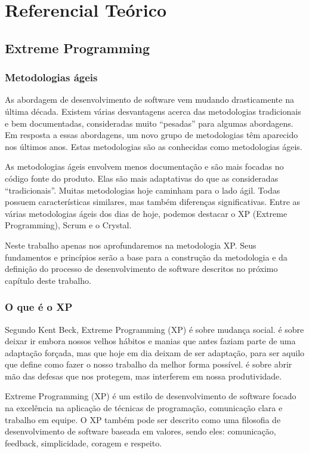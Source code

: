 \part{Referencial Teórico}

\chapter[Extreme Programming]{Extreme Programming}

\section{Metodologias ágeis}

As abordagem de desenvolvimento de software vem mudando drasticamente na última década. Existem várias desvantagens acerca das metodologias tradicionais e bem documentadas, consideradas muito “pesadas” para algumas abordagens. Em resposta a essas abordagens, um novo grupo de metodologias têm aparecido nos últimos anos. Estas metodologias são as conhecidas como metodologias ágeis. \cite{Agarwal:2008}

As metodologias ágeis envolvem menos documentação e são mais focadas no código fonte do produto. Elas são mais adaptativas do que as consideradas “tradicionais”. Muitas metodologias hoje caminham para o lado ágil. Todas possuem características similares, mas também diferenças significativas. Entre as várias metodologias ágeis dos dias de hoje, podemos destacar o XP (Extreme Programming), Scrum e o Crystal.

Neste trabalho apenas nos aprofundaremos na metodologia XP. Seus fundamentos e princípios serão a base para a construção da metodologia e da definição do processo de desenvolvimento de software descritos no próximo capítulo deste trabalho.

\section{O que é o XP}

Segundo Kent Beck,  Extreme Programming (XP) é sobre mudança social. é sobre deixar ir embora nossos velhos hábitos e manias que antes faziam parte de uma adaptação forçada, mas que hoje em dia deixam de ser adaptação, para ser aquilo que define como fazer o nosso trabalho da melhor forma possível. é sobre abrir mão das defesas que nos protegem, mas interferem em nossa produtividade.

Extreme Programming (XP) é um estilo de desenvolvimento de software focado na excelência na aplicação de técnicas de programação, comunicação clara e trabalho em equipe. O XP também pode ser descrito como uma filosofia de desenvolvimento de software baseada em valores, sendo eles: comunicação, feedback, simplicidade, coragem e respeito.

